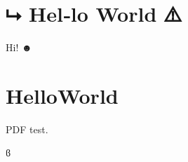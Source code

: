 \documentclass{article}%
\begin{document}
\section{⮡ Hel‑lo World ⚠}

Hi! ☻

\makeatletter%
\section{\unicodepointsUni@tarentPfeil{} Hel\unicodepoints@nbdash{}lo\underbar{}World \unicodepoints@warn{}}
\makeatother%

 PDF test.

ϐ
\end{document}

